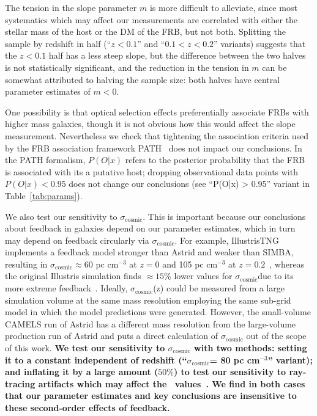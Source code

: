 \documentclass[twocolumn,linenumbers]{aastex631}
\newcommand{\msbold}[1]{\textbf{#1}}
\newcommand{\sigmacosmic}{\ensuremath{{\sigma}_\textrm{cosmic}}}
\begin{document}
The tension in the slope parameter $m$ is more difficult to alleviate, since most systematics which may affect our measurements are correlated with either the stellar mass of the host or the DM of the FRB, but not both. Splitting the sample by redshift in half (``$z < 0.1$'' and ``$0.1 < z < 0.2$'' variants) suggests that the $z < 0.1$ half has a less steep slope, but the difference between the two halves is not statistically significant, and the reduction in the tension in $m$ can be somewhat attributed to halving the sample size: both halves have central parameter estimates of $m < 0$. 

One possibility is that optical selection effects preferentially associate FRBs with higher mass galaxies, though it is not obvious how this would affect the slope measurement. Nevertheless we check that tightening the association criteria used by the FRB association framework PATH~\citep[Probabilistically Associating Transients with their Hosts][]{aggarwal2021probabilistic} does not impact our conclusions. In the PATH formalism, $P(O|x)$ refers to the posterior probability that the FRB is associated with its a putative host; dropping observational data points with $P(O|x) < 0.95$ does not change our conclusions (see ``P(O|x) > 0.95'' variant in Table~\ref{tab:params}). 

We also test our sensitivity to $\sigmacosmic$. This is important because our conclusions about feedback in galaxies depend on our parameter estimates, which in turn may depend on feedback circularly via \sigmacosmic. For example, IllustrisTNG implements a feedback model stronger than Astrid and weaker than SIMBA, resulting in $\sigma_\textrm{cosmic} \approx 60$ pc cm$^{-3}$ at $z = 0$ and 105 pc cm$^{-3}$ at $z = 0.2$~\citep{walker2024dispersion}, whereas the original Illustris simulation finds $\approx15\%$ lower values for \sigmacosmic due to its more extreme feedback~\citealp[see Fig. 2 of]{jaroszynski2019fast}. Ideally, \sigmacosmic(z) could be measured from a large simulation volume at the same mass resolution employing the same sub-grid model in which the model predictions were generated. However, the small-volume CAMELS run of Astrid has a different mass resolution from the large-volume production run of Astrid and puts a direct calculation of $\sigmacosmic$ out of the scope of this work. \msbold{We test our sensitivity to $\sigmacosmic$ with two methods: setting it to a constant independent of redshift (``\sigmacosmic = 80 pc cm$^{-3}$'' variant); and inflating it by a large amount ($50\%$) to test our sensitivity to ray-tracing artifacts which may affect the~\citet{walker2024dispersion} values~\citep{konietzka2025ray}. 
We find in both cases that our parameter estimates and key conclusions are insensitive to these second-order effects of feedback.}
\end{document}
